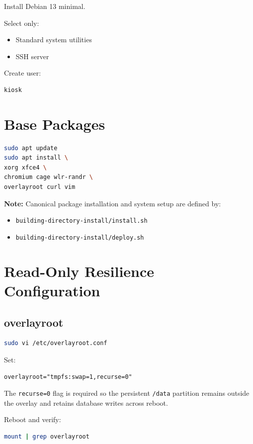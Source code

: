 \documentclass[11pt,letterpaper]{article}
\begin{document}
Install Debian 13 minimal.

Select only:
\begin{itemize}
\item Standard system utilities
\item SSH server
\end{itemize}

Create user:
\begin{lstlisting}
kiosk
\end{lstlisting}

\section{Base Packages}

\begin{lstlisting}[language=bash]
sudo apt update
sudo apt install \
xorg xfce4 \
chromium cage wlr-randr \
overlayroot curl vim
\end{lstlisting}

\textbf{Note:} Canonical package installation and system setup are defined by:
\begin{itemize}
\item \texttt{building-directory-install/install.sh}
\item \texttt{building-directory-install/deploy.sh}
\end{itemize}

\section{Read-Only Resilience Configuration}

\subsection{overlayroot}

\begin{lstlisting}[language=bash]
sudo vi /etc/overlayroot.conf
\end{lstlisting}

Set:
\begin{lstlisting}
overlayroot="tmpfs:swap=1,recurse=0"
\end{lstlisting}

The \texttt{recurse=0} flag is required so the persistent \texttt{/data}
partition remains outside the overlay and retains database writes across reboot.

Reboot and verify:
\begin{lstlisting}[language=bash]
mount | grep overlayroot
\end{lstlisting}
\end{document}

